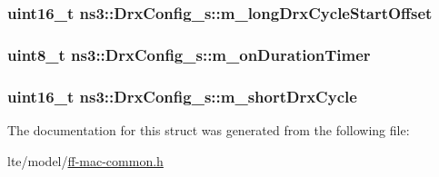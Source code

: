 \subsubsection[{\texorpdfstring{m\+\_\+long\+Drx\+Cycle\+Start\+Offset}{m_longDrxCycleStartOffset}}]{\setlength{\rightskip}{0pt plus 5cm}uint16\+\_\+t ns3\+::\+Drx\+Config\+\_\+s\+::m\+\_\+long\+Drx\+Cycle\+Start\+Offset}\hypertarget{structns3_1_1DrxConfig__s_a0da782d97d2a346c7eed2cfa79030999}{}\label{structns3_1_1DrxConfig__s_a0da782d97d2a346c7eed2cfa79030999}
\subsubsection[{\texorpdfstring{m\+\_\+on\+Duration\+Timer}{m_onDurationTimer}}]{\setlength{\rightskip}{0pt plus 5cm}uint8\+\_\+t ns3\+::\+Drx\+Config\+\_\+s\+::m\+\_\+on\+Duration\+Timer}\hypertarget{structns3_1_1DrxConfig__s_aec35b05342ab4b47d0c4ce4f6a7dfc11}{}\label{structns3_1_1DrxConfig__s_aec35b05342ab4b47d0c4ce4f6a7dfc11}
\subsubsection[{\texorpdfstring{m\+\_\+short\+Drx\+Cycle}{m_shortDrxCycle}}]{\setlength{\rightskip}{0pt plus 5cm}uint16\+\_\+t ns3\+::\+Drx\+Config\+\_\+s\+::m\+\_\+short\+Drx\+Cycle}\hypertarget{structns3_1_1DrxConfig__s_a9c94423a6a2c8ea9226ca7678d2082be}{}\label{structns3_1_1DrxConfig__s_a9c94423a6a2c8ea9226ca7678d2082be}


The documentation for this struct was generated from the following file\+:\begin{DoxyCompactItemize}
\item 
lte/model/\hyperlink{ff-mac-common_8h}{ff-\/mac-\/common.\+h}\end{DoxyCompactItemize}
